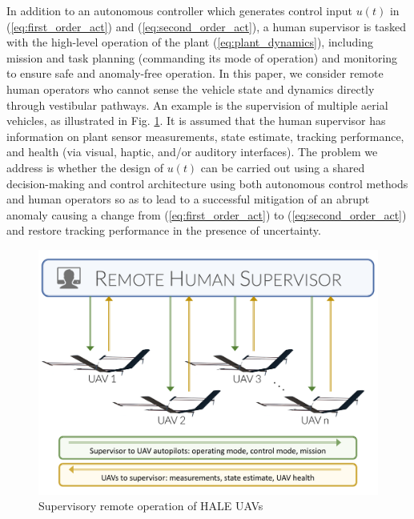 \documentclass[english]{ifacconf}
\begin{document}
In addition to an autonomous controller which generates control input $u(t)$ in (\ref{eq:first_order_act}) and (\ref{eq:second_order_act}), a human supervisor is tasked with the high-level operation of the plant (\ref{eq:plant_dynamics}), including mission and task planning (commanding its mode of operation) and monitoring to ensure safe and anomaly-free operation. In this paper, we consider remote human operators who cannot sense the vehicle state and dynamics directly through vestibular pathways. An example is the supervision of multiple aerial vehicles, as illustrated in Fig. \ref{fig:uav_supervisor}. It is assumed that the human supervisor has information on plant sensor measurements, state estimate, tracking performance, and health (via visual, haptic, and/or auditory interfaces). The problem we address is whether the design of $u(t)$ can be carried out using a shared decision-making and control architecture using both autonomous control methods and human operators so as to lead to a successful mitigation of an abrupt anomaly causing a change from (\ref{eq:first_order_act}) to (\ref{eq:second_order_act}) and restore tracking performance in the presence of uncertainty.

\begin{figure}[htbp]
	\centering
	\includegraphics[width=0.95\columnwidth]{../fig/uav_supervisor.pdf}
	\caption{Supervisory remote operation of HALE UAVs}
	\label{fig:uav_supervisor}
\end{figure}

\end{document}
